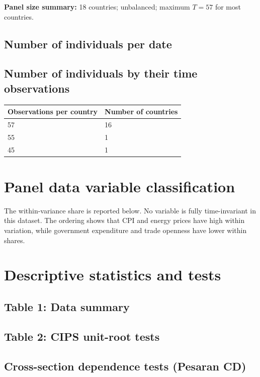 \documentclass[11pt]{article}
\begin{document}
\textbf{Panel size summary:} 18 countries; unbalanced; maximum $T=57$ for most countries.

\subsection*{Number of individuals per date}

\subsection*{Number of individuals by their time observations}
\begin{tabular}{ll}
\toprule
Observations per country & Number of countries \\
\midrule
57 & 16 \\
55 & 1 \\
45 & 1 \\
\bottomrule
\end{tabular}

\section*{Panel data variable classification}
The within-variance share is reported below. No variable is fully time-invariant in this dataset. The ordering shows that CPI and energy prices have high within variation, while government expenditure and trade openness have lower within shares.


\section*{Descriptive statistics and tests}
\subsection*{Table 1: Data summary}

\subsection*{Table 2: CIPS unit-root tests}

\subsection*{Cross-section dependence tests (Pesaran CD)}
\end{document}
